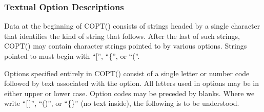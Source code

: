 \documentclass[twoside]{MATH77}
\begin{document}
\begin{multicols}{2}
\subsubsection{Textual Option Descriptions\label{Textopt}}
Data at the beginning of COPT() consists of strings headed by a single
character that identifies the kind of string that follows.  After the
last of such strings, COPT() may contain character strings pointed to by
various options.  Strings pointed to must begin with ``['', ``\{'', or
``(''.

Options specified entirely in COPT() consist of a single letter or number
code followed by text associated with the option.  All letters used in
options may be in either upper or lower case.  Option codes may be
preceded by blanks.  Where we write ``[\,]'', ``()'', or ``\{\}'' (no text
inside), the following is to be understood.


\end{multicols}
\end{document}
